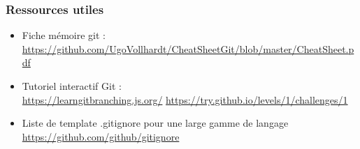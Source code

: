 \documentclass{beamer}
\begin{document}
\begin{frame}
\frametitle{Ressources utiles}
\begin{itemize}
	\item Fiche mémoire git : \\
	\url{https://github.com/UgoVollhardt/CheatSheetGit/blob/master/CheatSheet.pdf}
	\item Tutoriel interactif Git : \\
	\url{https://learngitbranching.js.org/}
	\url{https://try.github.io/levels/1/challenges/1}
	\item Liste de template .gitignore pour une large gamme de langage
	\url{https://github.com/github/gitignore}
\end{itemize}


\end{frame}
\end{document}
